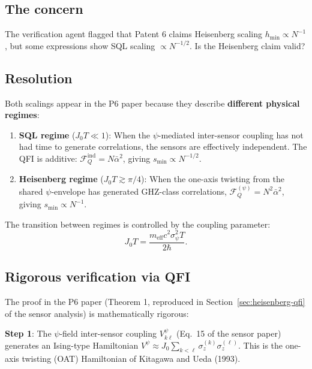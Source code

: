 \documentclass[11pt]{article}
\theoremstyle{definition}
\theoremstyle{remark}
\begin{document}
\subsection{The concern}

The verification agent flagged that Patent 6 claims Heisenberg scaling
$h_{\min} \propto N^{-1}$, but some expressions show SQL scaling
$\propto N^{-1/2}$. Is the Heisenberg claim valid?

\subsection{Resolution}

Both scalings appear in the P6 paper because they describe
\textbf{different physical regimes}:

\begin{enumerate}
\item \textbf{SQL regime} ($J_0 T \ll 1$): When the $\psi$-mediated
inter-sensor coupling has not had time to generate correlations, the
sensors are effectively independent. The QFI is additive:
$\mathcal{F}_Q^{\mathrm{ind}} = N\bar{\alpha}^2$, giving
$s_{\min} \propto N^{-1/2}$.

\item \textbf{Heisenberg regime} ($J_0 T \gtrsim \pi/4$): When the
one-axis twisting from the shared $\psi$-envelope has generated
GHZ-class correlations, $\mathcal{F}_Q^{(\psi)} = N^2\bar{\alpha}^2$,
giving $s_{\min} \propto N^{-1}$.
\end{enumerate}

The transition between regimes is controlled by the coupling parameter:
\begin{equation}
J_0 T = \frac{m_{\mathrm{eff}} c^2 \sigma_\psi^2 T}{2\hbar}.
\end{equation}

\subsection{Rigorous verification via QFI}

The proof in the P6 paper (Theorem 1, reproduced in Section~\ref{sec:heisenberg-qfi} of the sensor analysis) is mathematically rigorous:

\textbf{Step 1}: The $\psi$-field inter-sensor coupling
$V_{k\ell}^\psi$ (Eq.~15 of the sensor paper) generates an Ising-type
Hamiltonian $V^\psi \approx J_0 \sum_{k<\ell} \sigma_z^{(k)}
\sigma_z^{(\ell)}$. This is the one-axis twisting (OAT) Hamiltonian
of Kitagawa and Ueda (1993).
\end{document}

